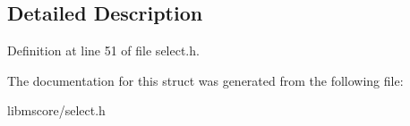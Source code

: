 \subsection{Detailed Description}


Definition at line 51 of file select.\+h.



The documentation for this struct was generated from the following file\+:\begin{DoxyCompactItemize}
\item 
libmscore/select.\+h\end{DoxyCompactItemize}
